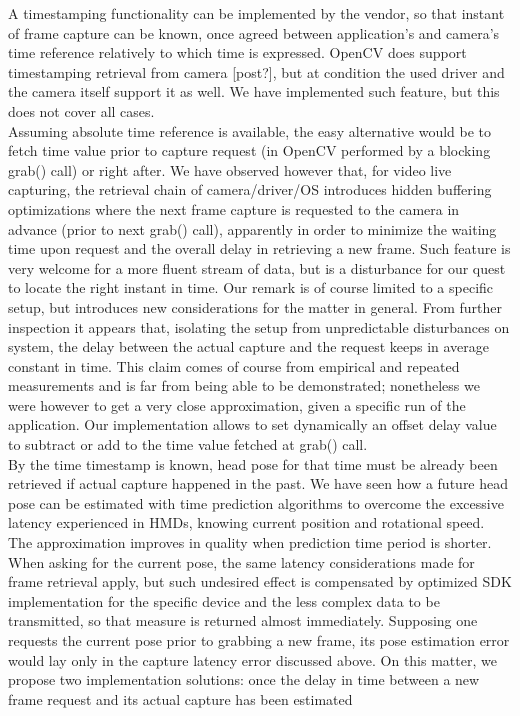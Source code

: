 A timestamping functionality can be implemented by the vendor, so that instant of frame capture can be known, once agreed between application's and camera's time reference relatively to which time is expressed. OpenCV does support timestamping retrieval from camera [post?], but at condition the used driver and the camera itself support it as well. We have implemented such feature, but this does not cover all cases.\\
Assuming absolute time reference is available, the easy alternative would be to fetch time value prior to capture request (in OpenCV performed by a blocking grab() call) or right after. We have observed however that, for video live capturing, the retrieval chain of camera/driver/OS introduces hidden buffering optimizations where the next frame capture is requested to the camera in advance (prior to next grab() call), apparently in order to minimize the waiting time upon request and the overall delay in retrieving a new frame. Such feature is very welcome for a more fluent stream of data, but is a disturbance for our quest to locate the right instant in time. Our remark is of course limited to a specific setup, but introduces new considerations for the matter in general. From further inspection it appears that, isolating the setup from unpredictable disturbances on system, the delay between the actual capture and the request keeps in average constant in time. This claim comes of course from empirical and repeated measurements and is far from being able to be demonstrated; nonetheless we were however to get a very close approximation, given a specific run of the application. Our implementation allows to set dynamically an offset delay value to subtract or add to the time value fetched at grab() call.\\
By the time timestamp is known, head pose for that time must be already been retrieved if actual capture happened in the past. We have seen how a future head pose can be estimated with time prediction algorithms to overcome the excessive latency experienced in HMDs, knowing current position and rotational speed. The approximation improves in quality when prediction time period is shorter. When asking for the current pose, the same latency considerations made for frame retrieval apply, but such undesired effect is compensated by optimized SDK implementation for the specific device and the less complex data to be transmitted, so that measure is returned almost immediately. Supposing one requests the current pose prior to grabbing a new frame, its pose estimation error would lay only in the capture latency error discussed above. On this matter, we propose two implementation solutions: once the delay in time between a new frame request and its actual capture has been estimated
